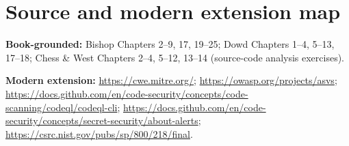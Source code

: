 \documentclass[
  letterpaper,
]{article}
\begin{document}
\section{Source and modern extension
map}\label{source-and-modern-extension-map}

\textbf{Book-grounded:} Bishop Chapters 2--9, 17, 19--25; Dowd Chapters
1--4, 5--13, 17--18; Chess \& West Chapters 2--4, 5--12, 13--14
(source-code analysis exercises).

\textbf{Modern extension:} \url{https://cwe.mitre.org/};
\url{https://owasp.org/projects/asvs};
\url{https://docs.github.com/en/code-security/concepts/code-scanning/codeql/codeql-cli};
\url{https://docs.github.com/en/code-security/concepts/secret-security/about-alerts};
\url{https://csrc.nist.gov/pubs/sp/800/218/final}.
\end{document}
